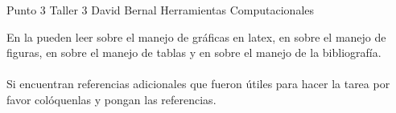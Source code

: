 \documentclass[12pt]{article}
\begin{document}
Punto 3 Taller 3 David Bernal Herramientas Computacionales


En la \cite{website:Latex-Graphics} pueden leer sobre el manejo de gr\'aficas en latex, en \cite{website:Latex-Figures} sobre el manejo de figuras, en \cite{website:Latex-Tables} sobre el manejo de tablas y en \cite{website:Latex-Bibliography} sobre el manejo de la bibliograf\'ia.\\ \\
Si encuentran referencias adicionales que fueron \'utiles para hacer la tarea por favor col\'oquenlas y pongan las referencias.




\end{document}
